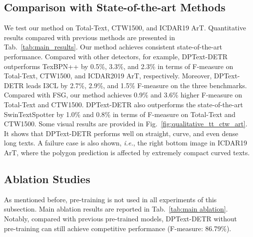 \documentclass[letterpaper]{article} \usepackage{aaai23}  \usepackage{times}  \usepackage{helvet}  \usepackage{courier}  \usepackage[hyphens]{url}  \usepackage{graphicx} \urlstyle{rm}
\begin{document}
\subsection{Comparison with State-of-the-art Methods}
We test our method on Total-Text, CTW1500, and ICDAR19 ArT. Quantitative results compared with previous methods are presented in Tab.~\ref{tab:main_results}. Our method achieves consistent state-of-the-art performance. Compared with other detectors, for example, DPText-DETR outperforms TexBPN++ by 0.5\%, 3.3\%, and 2.3\% in terms of F-measure on Total-Text, CTW1500, and ICDAR2019 ArT, respectively. Moreover, DPText-DETR leads I3CL by 2.7\%, 2.9\%, and 1.5\% F-measure on the three benchmarks. Compared with FSG, our method achieves 0.9\% and 3.6\% higher F-measure on Total-Text and CTW1500. DPText-DETR also outperforms the state-of-the-art SwinTextSpotter by 1.0\% and 0.8\% in terms of F-measure on Total-Text and CTW1500. 
Some visual results are provided in Fig.~\ref{fig:qualitative_tt_ctw_art}. It shows that DPText-DETR performs well on straight, curve, and even dense long texts. A failure case is also shown, \emph{i.e.}, the right bottom image in ICDAR19 ArT, where the polygon prediction is affected by extremely compact curved texts. 

\subsection{Ablation Studies}
As mentioned before, pre-training is not used in all experiments of this subsection. Main ablation results are reported in Tab.~\ref{tab:main ablation}. Notably, compared with previous pre-trained models, DPText-DETR without pre-training can still achieve competitive performance (F-measure: 86.79$\%$).
\end{document}
